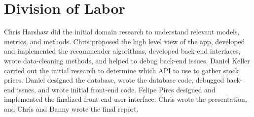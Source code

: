 \documentclass{article}
\begin{document}
\section{Division of Labor} \label{sec:division}
Chris Harshaw did the initial domain research to understand relevant models, metrics, and methods. Chris proposed the high level view of the app, developed and implemented the recommender algorithms, developed back-end interfaces, wrote data-cleaning methods, and helped to debug back-end issues.  Daniel Keller carried out the initial research to determine which API to use to gather stock prices. Daniel designed the database, wrote the database code, debugged back-end issues, and wrote initial front-end code. Felipe Pires designed and implemented the finalized front-end user interface. Chris wrote the presentation, and Chris and Danny wrote the final report.
\end{document}
